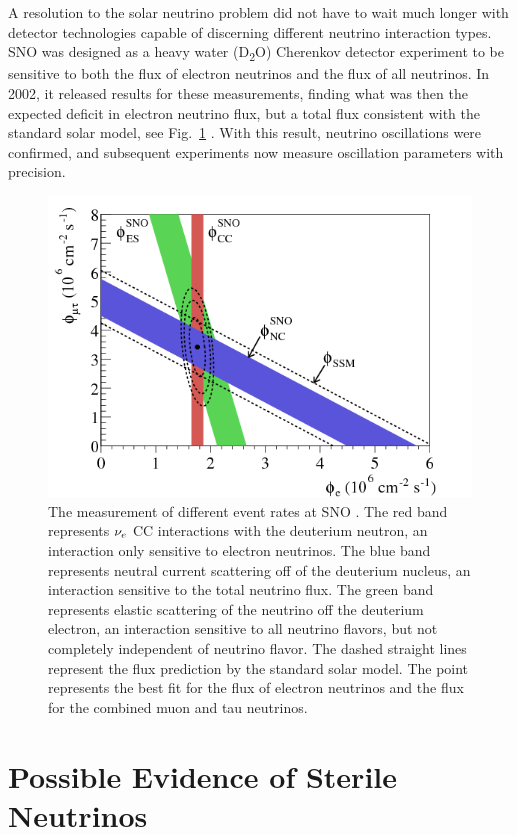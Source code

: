 A resolution to the solar neutrino problem did not have to wait much longer with detector technologies capable of discerning different neutrino interaction types. SNO was designed as a heavy water (D\textsubscript{2}O) Cherenkov detector experiment to be sensitive to both the flux of electron neutrinos and the flux of all neutrinos. In 2002, it released results for these measurements, finding what was then the expected deficit in electron neutrino flux, but a total flux consistent with the standard solar model, see Fig.~\ref{fig:SNO} \cite{ref:SNO02}. With this result, neutrino oscillations were confirmed, and subsequent experiments now measure oscillation parameters with precision.

\begin{figure}
\includegraphics[width=\textwidth]{figures/SNOResult.png}
\caption[SNO Result]{The measurement of different event rates at SNO \cite{ref:SNO02}. The red band represents $\nu_{e}$ CC interactions with the deuterium neutron, an interaction only sensitive to electron neutrinos. The blue band represents neutral current scattering off of the deuterium nucleus, an interaction sensitive to the total neutrino flux. The green band represents elastic scattering of the neutrino off the deuterium electron, an interaction sensitive to all neutrino flavors, but not completely independent of neutrino flavor. The dashed straight lines represent the flux prediction by the standard solar model. The point represents the best fit for the flux of electron neutrinos and the flux for the combined muon and tau neutrinos.
\label{fig:SNO}}
\end{figure}

\section{Possible Evidence of Sterile Neutrinos}
\label{sec:SterHist}

